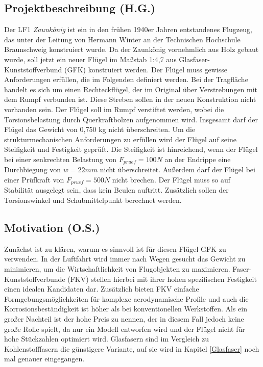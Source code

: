 
\subsection{Projektbeschreibung (H.G.)}
Der LF1 \textit{Zaunkönig} ist ein in den frühen 1940er Jahren entstandenes Flugzeug, das unter der Leitung von Hermann Winter an der Technischen Hochschule Braunschweig konstruiert wurde. Da der Zaunkönig vornehmlich aus Holz gebaut wurde, soll jetzt ein neuer Flügel im Maßstab 1:4,7 aus Glasfaser-Kunststoffverbund (GFK) konstruiert werden. Der Flügel muss gewisse Anforderungen erfüllen, die im Folgenden definiert werden.
Bei der Tragfläche handelt es sich um einen Rechteckflügel, der im Original über Verstrebungen mit dem Rumpf verbunden ist. Diese Streben sollen in der neuen Konstruktion nicht vorhanden sein. Der Flügel soll im Rumpf verstiftet werden, wobei die Torsionsbelastung durch Querkraftbolzen aufgenommen wird. Insgesamt darf der Flügel das Gewicht von 0,750 kg nicht überschreiten.
Um die strukturmechanischen Anforderungen zu erfüllen wird der Flügel auf seine Steifigkeit und Festigkeit geprüft. Die Steifigkeit ist hinreichend, wenn der Flügel bei einer senkrechten Belastung von $ F_{pruef}=100N $ an der Endrippe eine Durchbiegung von $ w=22mm $ nicht überschreitet. Außerdem darf der Flügel bei einer Prüfkraft von $ F_{pruef}=500N $ nicht brechen. Der Flügel muss so auf Stabilität ausgelegt sein, dass kein Beulen auftritt. Zusätzlich sollen der Torsionswinkel und Schubmittelpunkt berechnet werden.
\subsection{Motivation (O.S.)}
Zunächst ist zu klären, warum es sinnvoll ist für diesen Flügel GFK zu verwenden. In der Luftfahrt wird immer nach Wegen gesucht das Gewicht zu minimieren, um die Wirtschaftlichkeit von Flugobjekten zu maximieren. Faser-Kunststoffverbunde (FKV) stellen hierbei mit ihrer hohen spezifischen Festigkeit einen idealen Kandidaten dar. Zusätzlich bieten FKV einfache Formgebungsmöglichkeiten für komplexe aerodynamische Profile und auch die Korrosionsbeständigkeit ist höher als bei konventionellen Werkstoffen. Als ein großer Nachteil ist der hohe Preis zu nennen, der in diesem Fall jedoch keine große Rolle spielt, da nur ein Modell entworfen wird und der Flügel nicht für hohe Stückzahlen optimiert wird. Glasfasern sind im Vergleich zu Kohlenstofffasern die günstigere Variante, auf sie wird in Kapitel \ref{Glasfaser} noch mal genauer eingegangen.
